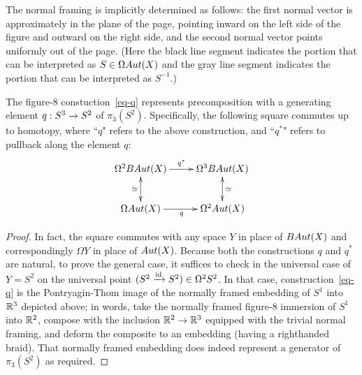 \documentclass{amsart}
\begin{document}
The normal framing is implicitly determined as follows: the first normal vector is approximately in the plane of the page, pointing inward on the left side of the figure and outward on the right side, and the second normal vector points uniformly out of the page.  (Here the black line segment indicates the portion that can be interpreted as $S \in \Omega Aut(X)$ and the gray line segment indicates the portion that can be interpreted as $S^{-1}$.)


\begin{lemma} \label{lemma-q}
The figure-8 constuction~\eqref{eq-q} represents precomposition with a generating element $q: S^3 \rightarrow S^2$ of $\pi_3(S^2)$.  Specifically, the following square commutes up to homotopy, where ``$q$" refers to the above construction, and ``$q^\ast$" refers to pullback along the element $q$:
\begin{equation} \nn
\xymatrix{
\Omega^2 B\Aut(X) \ar[r]^{q^\ast} \ar@{<->}[d]_{\simeq} & \Omega^3 B\Aut(X)  \ar@{<->}[d]^{\simeq} \\
\Omega \Aut(X) \ar[r]_{q} & \Omega^2 \Aut(X)
}
\end{equation}
\end{lemma}

\begin{proof}
In fact, the square commutes with any space $Y$ in place of $BAut(X)$ and correspondingly $\Omega Y$ in place of $Aut(X)$.  Because both the constructions $q$ and $q^\ast$ are natural, to prove the general case, it suffices to check in the universal case of $Y = S^2$ on the universal point $(S^2 \xrightarrow{\mathrm{id}} S^2) \in \Omega^2 S^2$.  In that case, construction~\eqref{eq-q} is the Pontryagin-Thom image of the normally framed embedding of $S^1$ into $\mathbb R^3$ depicted above; in words, take the normally framed figure-8 immersion of $S^1$ into $\mathbb R^2$, compose with the inclusion $\mathbb R^2 \rightarrow \mathbb R^3$ equipped with the trivial normal framing, and deform the composite to an embedding (having a righthanded braid).  That normally framed embedding does indeed represent a generator of $\pi_3(S^2)$ as required.
\end{proof}
\end{document}
